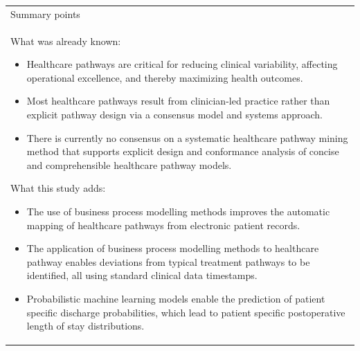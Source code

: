 \begin{table}[h]
\centering
\begin{tabular}{p{11cm}} 
 Summary points\\ 
 What was already known:
 \begin{itemize}
     \item Healthcare pathways are critical for reducing clinical variability, affecting operational excellence, and thereby maximizing health outcomes.
     \item  Most healthcare pathways result from clinician-led practice rather than explicit pathway design via a consensus model and systems approach. 
     \item  There is currently no consensus on a systematic healthcare pathway mining method that supports explicit design and conformance analysis of concise and comprehensible healthcare pathway models.
 \end{itemize}
 What this study adds:
 \begin{itemize}
     \item  The use of business process modelling methods improves the automatic mapping of healthcare pathways from electronic patient records.
     \item The application of business process modelling methods to
       healthcare pathway enables deviations from typical treatment
       pathways to be identified, all using standard clinical data
       timestamps.
     \item Probabilistic machine learning models enable the prediction
       of patient specific discharge probabilities, which lead to
       patient specific postoperative
       length of stay distributions.
 \end{itemize}
\end{tabular}
\end{table}

